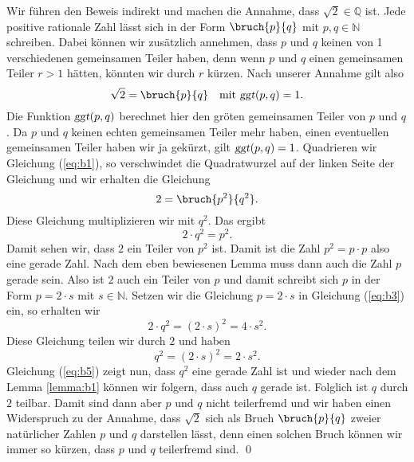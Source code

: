 \proof
Wir f\"{u}hren den Beweis indirekt und machen die Annahme, dass $\sqrt{2} \in \mathbb{Q}$ ist.  Jede positive
rationale Zahl l\"{a}sst sich in der Form $\bruch{p}{q}$ mit $p,q \in \mathbb{N}$ schreiben.  Dabei k\"{o}nnen
wir zus\"{a}tzlich annehmen, dass  $p$ und $q$ keinen von 1 verschiedenen gemeinsamen Teiler haben, denn
wenn $p$ und $q$ einen gemeinsamen Teiler $r > 1$ h\"{a}tten, k\"{o}nnten wir durch $r$ k\"{u}rzen.  Nach unserer 
Annahme gilt also
\begin{equation}
  \label{eq:b1}
  \sqrt{2} = \bruch{p}{q} \quad \mbox{mit $\textsl{ggt}(p,q) = 1$}.
\end{equation}
Die Funktion $\textsl{ggt}(p,q)$ berechnet hier den gr\"{o}\3ten gemeinsamen Teiler von $p$ und $q$.   
Da $p$ und $q$ keinen echten gemeinsamen Teiler mehr haben, einen eventuellen gemeinsamen Teiler
haben wir ja gek\"{u}rzt, gilt $\textsl{ggt}(p, q) = 1$.  Quadrieren wir  Gleichung (\ref{eq:b1}), so
verschwindet die Quadratwurzel auf der linken Seite der Gleichung und wir erhalten die Gleichung
\begin{equation}
  \label{eq:b2}
  2 = \bruch{p^2}{q^2}.
\end{equation}
Diese Gleichung multiplizieren wir mit $q^2$.  Das ergibt
\begin{equation}
  \label{eq:b3}
  2 \cdot q^2 = p^2.
\end{equation}
Damit sehen wir, dass $2$ ein Teiler von $p^2$ ist.  Damit ist die Zahl $p^2 = p \cdot p$ also eine gerade Zahl.
Nach dem eben bewiesenen Lemma muss dann auch die Zahl $p$ gerade sein.
Also ist $2$ auch ein Teiler von $p$ und damit schreibt sich $p$ in der Form $p = 2 \cdot s$ mit $s
\in \mathbb{N}$.  Setzen 
wir die Gleichung $p = 2 \cdot s$ in Gleichung (\ref{eq:b3}) ein, so erhalten wir 
\begin{equation}
  \label{eq:b4}
  2 \cdot q^2 = (2 \cdot s)^2 = 4 \cdot s^2.
\end{equation}
Diese Gleichung teilen wir durch $2$ und haben
\begin{equation}
  \label{eq:b5}
  q^2 = (2 \cdot s)^2 = 2 \cdot s^2.
\end{equation}
Gleichung (\ref{eq:b5}) zeigt nun, dass $q^2$ eine gerade Zahl ist und wieder nach dem Lemma
\ref{lemma:b1} k\"{o}nnen wir folgern, dass auch  $q$ gerade ist.  Folglich ist $q$ durch $2$ teilbar.
Damit sind dann aber $p$ und $q$ nicht teilerfremd und wir haben einen Widerspruch zu der
Annahme, dass $\sqrt{2}$ sich als Bruch $\bruch{p}{q}$ zweier nat\"{u}rlicher Zahlen $p$ und $q$
darstellen l\"{a}sst, denn einen solchen Bruch k\"{o}nnen wir immer so k\"{u}rzen, dass $p$ und $q$ teilerfremd
sind. 
\qed


